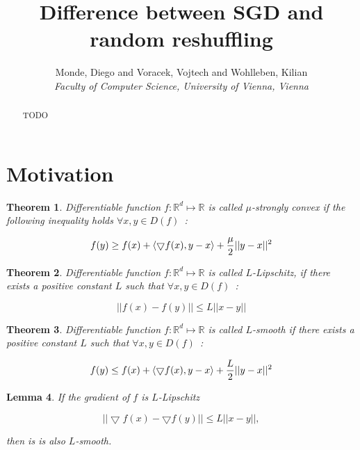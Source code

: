 \documentclass[10pt,conference,compsocconf]{IEEEtran}
\newtheorem{theorem}{Theorem}
\newtheorem{lemma}[theorem]{Lemma}
\begin{document}
\title{Difference between SGD and random reshuffling}

\author{
  Monde, Diego and Voracek, Vojtech and Wohlleben, Kilian\\
  \textit{Faculty of Computer Science, University of Vienna, Vienna}
}

\maketitle

\begin{abstract}
TODO
\end{abstract}

\section{Motivation}
\label{sec:motivation}

\begin{theorem}
Differentiable function $f : \mathbb{R}^d \mapsto \mathbb{R}$ is called
\mbox{$\mu$-strongly} convex if the following inequality holds $\forall x, y \in
D(f)$~\cite{StrongConvexity}:

$$
f(y) \geq f(x) + \langle \bigtriangledown f(x), y - x \rangle + {\mu \over
2} || y - x ||^2
$$

\end{theorem}

\begin{theorem}
Differentiable function $f : \mathbb{R}^d \mapsto \mathbb{R}$ is called
\mbox{$L$-Lipschitz}, if there exists a positive constant $L$ such that
$\forall x, y \in D(f)$~\cite{L-Lipschitz}:

$$|| f(x) - f(y) || \leq L ||x - y||$$
\end{theorem}


\begin{theorem}
Differentiable function $f : \mathbb{R}^d \mapsto \mathbb{R}$ is called
\mbox{$L$-smooth} if there exists a positive constant $L$ such that
$\forall x, y \in D(f)$~\cite{L-Lipschitz}:

$$
f(y) \leq f(x) + \langle \bigtriangledown f(x), y - x \rangle + {L \over
2} || y - x ||^2
$$
\end{theorem}

\begin{lemma}
If the gradient of $f$ is \mbox{$L$-Lipschitz}

$$||\bigtriangledown f(x) - \bigtriangledown f(y)|| \leq L ||x-y||,$$

\noindent then is is also \mbox{$L$-smooth}.
\end{lemma}
\end{document}
